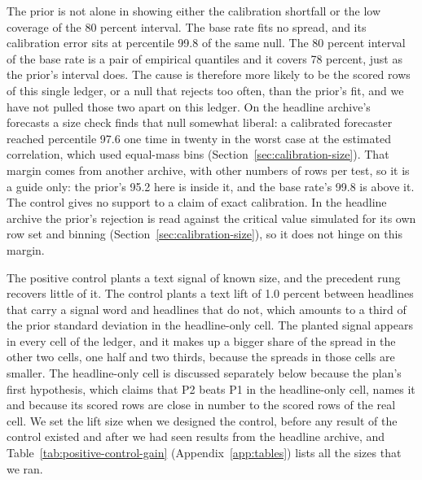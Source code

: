 The prior is not alone in showing either the calibration shortfall or the low coverage of the 80 percent interval. The base rate fits no spread, and its calibration error sits at percentile 99.8 of the same null. The 80 percent interval of the base rate is a pair of empirical quantiles and it covers 78 percent, just as the prior's interval does. The cause is therefore more likely to be the scored rows of this single ledger, or a null that rejects too often, than the prior's fit, and we have not pulled those two apart on this ledger. On the headline archive's forecasts a size check finds that null somewhat liberal: a calibrated forecaster reached percentile 97.6 one time in twenty in the worst case at the estimated correlation, which used equal-mass bins (Section~\ref{sec:calibration-size}). That margin comes from another archive, with other numbers of rows per test, so it is a guide only: the prior's 95.2 here is inside it, and the base rate's 99.8 is above it. The control gives no support to a claim of exact calibration. In the headline archive the prior's rejection is read against the critical value simulated for its own row set and binning (Section~\ref{sec:calibration-size}), so it does not hinge on this margin.

The positive control plants a text signal of known size, and the precedent rung recovers little of it. The control plants a text lift of 1.0 percent between headlines that carry a signal word and headlines that do not, which amounts to a third of the prior standard deviation in the headline-only cell. The planted signal appears in every cell of the ledger, and it makes up a bigger share of the spread in the other two cells, one half and two thirds, because the spreads in those cells are smaller. The headline-only cell is discussed separately below because the plan's first hypothesis, which claims that P2 beats P1 in the headline-only cell, names it and because its scored rows are close in number to the scored rows of the real cell. We set the lift size when we designed the control, before any result of the control existed and after we had seen results from the headline archive, and Table~\ref{tab:positive-control-gain} (Appendix~\ref{app:tables}) lists all the sizes that we ran.

